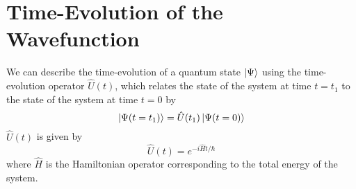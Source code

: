 %
%
%
%

\section*{Time-Evolution of the Wavefunction}

	We can describe the time-evolution of a quantum state $\ket{\Psi}$ using the time-evolution operator $\hat U (t)$, which relates the state of the system at time $t=t_1$ to the state of the system at time $t=0$ by
	\begin{equation*}
		\ket{\Psi(t=t_1)} = \hat U(t_1) \ket{\Psi(t=0)}
	\end{equation*}
	$\hat U(t)$ is given by 
	\begin{equation*}
		\hat U(t) = e^{-i\hat H t/\hbar}
	\end{equation*}
	where $\hat H$ is the Hamiltonian operator corresponding to the total energy of the system.
	
